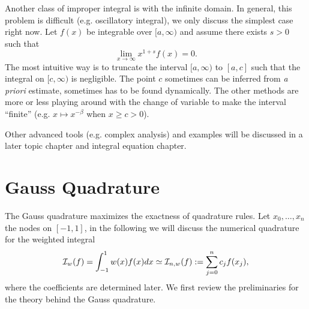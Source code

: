 Another class of improper integral is with the infinite domain.  In general, this problem is difficult (e.g. oscillatory integral), we only discuss the simplest case right now. Let $f(x)$ be integrable over $[a, \infty)$ and assume there exists $s > 0$ such that 
\begin{equation}
    \lim_{x\to\infty} x^{1+s} f(x) = 0.
\end{equation}
The most intuitive way is to truncate the interval $[a, \infty)$ to $[a, c]$ such that the integral on $[c, \infty)$ is negligible. The point $c$ sometimes can be inferred from \emph{a priori} estimate, sometimes has to be found dynamically. The other methods are more or less playing around with the change of variable to make the interval ``finite'' (e.g. $x\mapsto x^{-\beta}$ when $x\ge c > 0$). 

Other advanced tools (e.g. complex analysis) and examples will be discussed in a later topic chapter and integral equation chapter.

\section{Gauss Quadrature}
\label{Sec: 3-GAU-QUA}
The Gauss quadrature maximizes the exactness of quadrature rules. Let $x_0,\dots, x_n$ the nodes on $[-1,1]$, in the following we will discuss the numerical quadrature for the weighted integral 
$$\mathcal I_w(f) = \int_{-1}^1 w(x) f(x) dx\simeq \mathcal I_{n, w}(f):= \sum_{j=0}^n c_j f(x_j),$$
where the coefficients are determined later. We first review the preliminaries for the theory behind the Gauss quadrature.

